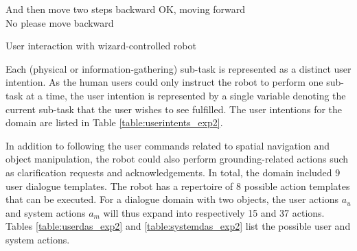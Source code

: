 \begin{Transcript}[p]
\begin{dialogue}
 \vspace{2mm}
 And then move two steps backward\vspace{2mm}
 OK, moving forward\vspace{1mm} \\
 \vspace{2mm}
 No please move backward \vspace{1mm} \\ 
 \vspace{2mm}
\end{dialogue}
\vspace{-4mm} \hspace{1cm} \vspace{3mm}
\caption{User interaction with wizard-controlled robot}
\end{Transcript}

Each (physical or information-gathering) sub-task is represented as a distinct user intention. As the human users could only instruct the robot to perform one sub-task at a time, the user intention is represented by a single variable denoting the current sub-task that the user wishes to see fulfilled.  The user intentions for the domain are listed in Table \ref{table:userintents_exp2}. 

In addition to following the user commands related to spatial navigation and object manipulation, the robot could also perform grounding-related actions such as clarification requests and acknowledgements. In total, the domain included 9 user dialogue templates.  The robot has a repertoire of 8 possible action templates that can be executed.  For a dialogue domain with two objects, the user actions $a_u$ and system actions $a_m$ will thus expand into respectively 15 and 37 actions.  Tables \ref{table:userdas_exp2} and \ref{table:systemdas_exp2} list the possible user and system actions.

\renewcommand{\arraystretch}{1.3}

